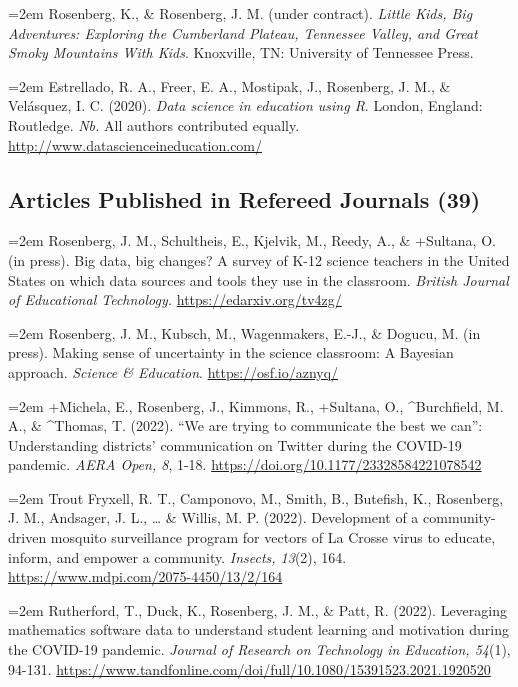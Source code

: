 \documentclass[
  14,
]{article}
\begin{document}
\hangindent=2em Rosenberg, K., \& Rosenberg, J. M. (under contract).
\emph{Little Kids, Big Adventures: Exploring the Cumberland Plateau,
Tennessee Valley, and Great Smoky Mountains With Kids}. Knoxville, TN:
University of Tennessee Press.

\hangindent=2em Estrellado, R. A., Freer, E. A., Mostipak, J.,
Rosenberg, J. M., \& Velásquez, I. C. (2020). \emph{Data science in
education using R}. London, England: Routledge. \emph{Nb.} All authors
contributed equally. \url{http://www.datascienceineducation.com/}

\hypertarget{articles-published-in-refereed-journals-39}{%
\subsection{Articles Published in Refereed Journals
(39)}\label{articles-published-in-refereed-journals-39}}

\hangindent=2em Rosenberg, J. M., Schultheis, E., Kjelvik, M., Reedy,
A., \& +Sultana, O. (in press). Big data, big changes? A survey of K-12
science teachers in the United States on which data sources and tools
they use in the classroom. \emph{British Journal of Educational
Technology.} \url{https://edarxiv.org/tv4zg/}

\hangindent=2em Rosenberg, J. M., Kubsch, M., Wagenmakers, E.-J., \&
Dogucu, M. (in press). Making sense of uncertainty in the science
classroom: A Bayesian approach. \emph{Science \& Education}.
\url{https://osf.io/aznyq/}

\hangindent=2em +Michela, E., Rosenberg, J., Kimmons, R., +Sultana, O.,
\^{}Burchfield, M. A., \& \^{}Thomas, T. (2022). ``We are trying to
communicate the best we can'': Understanding districts' communication on
Twitter during the COVID-19 pandemic. \emph{AERA Open, 8}, 1-18.
\url{https://doi.org/10.1177/23328584221078542}

\hangindent=2em Trout Fryxell, R. T., Camponovo, M., Smith, B.,
Butefish, K., Rosenberg, J. M., Andsager, J. L., \ldots{} \& Willis, M.
P. (2022). Development of a community-driven mosquito surveillance
program for vectors of La Crosse virus to educate, inform, and empower a
community. \emph{Insects, 13}(2), 164.
\url{https://www.mdpi.com/2075-4450/13/2/164}

\hangindent=2em Rutherford, T., Duck, K., Rosenberg, J. M., \& Patt, R.
(2022). Leveraging mathematics software data to understand student
learning and motivation during the COVID-19 pandemic. \emph{Journal of
Research on Technology in Education, 54}(1), 94-131.
\url{https://www.tandfonline.com/doi/full/10.1080/15391523.2021.1920520}
\end{document}
